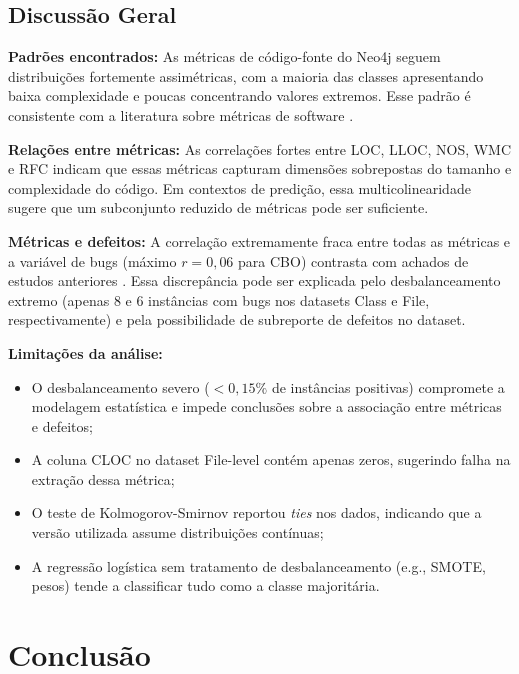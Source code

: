 \documentclass[12pt]{article}
\begin{document}
\subsection{Discussão Geral}

\textbf{Padrões encontrados:} As métricas de código-fonte do Neo4j seguem distribuições fortemente assimétricas, com a maioria das classes apresentando baixa complexidade e poucas concentrando valores extremos. Esse padrão é consistente com a literatura sobre métricas de software \cite{radjenovic2013, gyimothy2005}.

\textbf{Relações entre métricas:} As correlações fortes entre LOC, LLOC, NOS, WMC e RFC indicam que essas métricas capturam dimensões sobrepostas do tamanho e complexidade do código. Em contextos de predição, essa multicolinearidade sugere que um subconjunto reduzido de métricas pode ser suficiente.

\textbf{Métricas e defeitos:} A correlação extremamente fraca entre todas as métricas e a variável de bugs (máximo $r = 0{,}06$ para CBO) contrasta com achados de estudos anteriores \cite{basili1996, gyimothy2005}. Essa discrepância pode ser explicada pelo desbalanceamento extremo (apenas 8 e 6 instâncias com bugs nos datasets Class e File, respectivamente) e pela possibilidade de subreporte de defeitos no dataset.

\textbf{Limitações da análise:}
\begin{itemize}
  \item O desbalanceamento severo ($<0{,}15\%$ de instâncias positivas) compromete a modelagem estatística e impede conclusões sobre a associação entre métricas e defeitos;
  \item A coluna CLOC no dataset File-level contém apenas zeros, sugerindo falha na extração dessa métrica;
  \item O teste de Kolmogorov-Smirnov reportou \textit{ties} nos dados, indicando que a versão utilizada assume distribuições contínuas;
  \item A regressão logística sem tratamento de desbalanceamento (e.g., SMOTE, pesos) tende a classificar tudo como a classe majoritária.
\end{itemize}

\section{Conclusão} \label{sec:conclusao}
\end{document}
